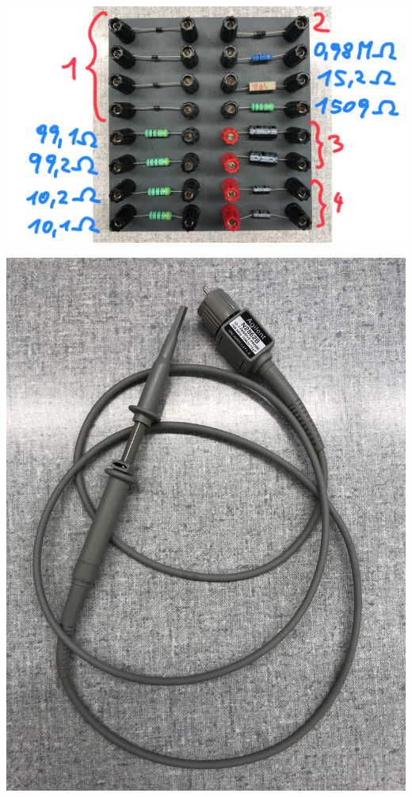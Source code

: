 \documentclass[11pt,ngerman]{scrartcl}
\begin{document}
\begin{minipage}{\textwidth}
	\begin{minipage}[t]{0.55\textwidth}
		\centering
		\includegraphics[width=\textwidth]{steck}
		\label{fig:steck}
	\end{minipage}
	\vspace{2mm}
	\begin{minipage}[t]{0.45\textwidth}
		\centering
		\includegraphics[width=\textwidth]{tastkabel}
		\label{fig:tastkabel}
	\end{minipage}
	\vspace{1em}
\end{minipage}
\end{document}
